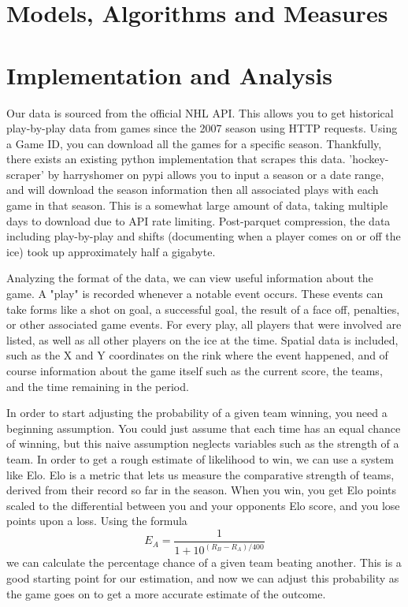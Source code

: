 \documentclass{article}
\begin{document}
\section{Models, Algorithms and Measures}

\section{Implementation and Analysis}
Our data is sourced from the official NHL API. This allows you to get historical play-by-play 
data from games since the 2007 season using HTTP requests. Using a Game ID, you can download 
all the games for a specific season. Thankfully, there exists an existing python implementation 
that scrapes this data. 'hockey-scraper' by harryshomer on pypi allows you to input a season
or a date range, and will download the season information then all associated plays with
each game in that season. This is a somewhat large amount of data, taking multiple days to 
download due to API rate limiting. Post-parquet compression, the data including play-by-play
and shifts (documenting when a player comes on or off the ice) took up approximately half a gigabyte.

Analyzing the format of the data, we can view useful information about the game. A "play" is 
recorded whenever a notable event occurs. These events can take forms like a shot on goal, 
a successful goal, the result of a face off, penalties, or other associated game events. 
For every play, all players that were involved are listed, as well as all other players on 
the ice at the time. Spatial data is included, such as the X and Y coordinates on the rink 
where the event happened, and of course information about the game itself such as the current 
score, the teams, and the time remaining in the period.

In order to start adjusting the probability of a given team winning, you need a beginning assumption.
You could just assume that each time has an equal chance of winning, but this naive assumption 
neglects variables such as the strength of a team. In order to get a rough estimate of likelihood 
to win, we can use a system like Elo. Elo is a metric that lets us measure the comparative strength 
of teams, derived from their record so far in the season. When you win, you get Elo points scaled 
to the differential between you and your opponents Elo score, and you lose points upon a loss. Using the formula 
\[E_{A} = \frac{1}{1 + 10^{(R_{B} - R_{A})/400}}\] we can calculate the percentage chance of a given team beating another.
This is a good starting point for our estimation, and now we can adjust this probability
as the game goes on to get a more accurate estimate of the outcome. 
\end{document}
